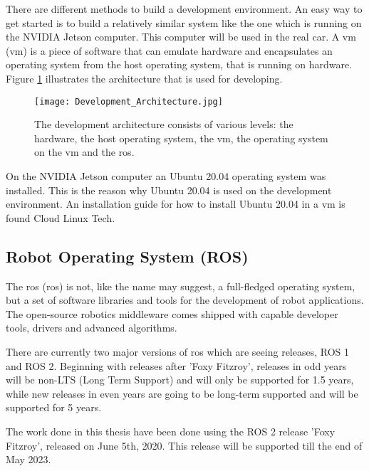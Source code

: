 There are different methods to build a development environment. An easy way to get started is to build a relatively similar system like the one which is running on the NVIDIA Jetson computer. This computer will be used in the real car. A \acrlong{vm} (\acrshort{vm}) is a piece of software that can emulate hardware and encapsulates an operating system from the host operating system, that is running on hardware. Figure \ref{fig:Development Architecture} illustrates the architecture that is used for developing.

\begin{figure}[H]
    \centering
    \texttt{[image: Development\_Architecture.jpg]}
    \caption{The development architecture consists of various levels: the hardware, the host operating system, the \acrlong{vm}, the operating system on the \acrshort{vm} and the \acrlong{ros}.}
    \label{fig:Development Architecture}
\end{figure}

On the NVIDIA Jetson computer an Ubuntu 20.04 operating system was installed. This is the reason why Ubuntu 20.04 is used on the development environment. An installation guide for how to install Ubuntu 20.04 in a \acrlong{vm} is found Cloud Linux Tech. \cite{cloudlinuxtech_install_ubuntu_2004}

\subsection{Robot Operating System (ROS)} \label{sec:Robot Operating System (ROS)}
The \acrlong{ros} (\acrshort{ros}) is not, like the name may suggest, a full-fledged operating system, but a set of software libraries and tools for the development of robot applications. The open-source robotics middleware comes shipped with capable developer tools, drivers and advanced algorithms. \cite{ros2_documentation}

There are currently two major versions of \acrshort{ros} which are seeing releases, ROS 1 and ROS 2. \cite{ros2_documentation} Beginning with releases after 'Foxy Fitzroy', releases in odd years will be non-LTS (Long Term Support) and will only be supported for 1.5 years, while new releases in even years are going to be long-term supported and will be supported for 5 years. \cite{ros2_documentation}

The work done in this thesis have been done using the ROS 2 release 'Foxy Fitzroy', released on June 5th, 2020. This release will be supported till the end of May 2023. \cite{ros2_releases_and_target_platforms}

